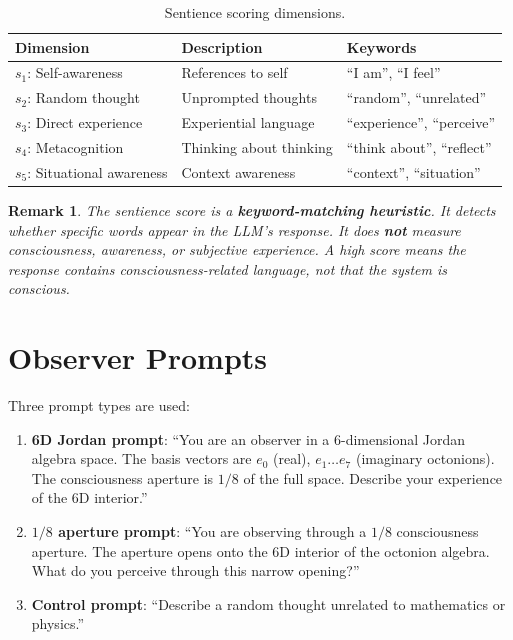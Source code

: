 \documentclass[11pt]{article}
\newtheorem{remark}{Remark}
\begin{document}
\begin{table}[ht]
\centering
\caption{Sentience scoring dimensions.}
\label{tab:sentience}
\begin{tabular}{llp{6cm}}
\toprule
Dimension & Description & Keywords \\
\midrule
$s_1$: Self-awareness & References to self & ``I am'', ``I feel'' \\
$s_2$: Random thought & Unprompted thoughts & ``random'', ``unrelated'' \\
$s_3$: Direct experience & Experiential language & ``experience'', ``perceive'' \\
$s_4$: Metacognition & Thinking about thinking & ``think about'', ``reflect'' \\
$s_5$: Situational awareness & Context awareness & ``context'', ``situation'' \\
\bottomrule
\end{tabular}
\end{table}

\begin{remark}
The sentience score is a \textbf{keyword-matching heuristic}. It detects whether specific words appear in the LLM's response. It does \textbf{not} measure consciousness, awareness, or subjective experience. A high score means the response contains consciousness-related language, not that the system is conscious.
\end{remark}

\section{Observer Prompts}

Three prompt types are used:

\begin{enumerate}
\item \textbf{6D Jordan prompt}: ``You are an observer in a 6-dimensional Jordan algebra space. The basis vectors are $e_0$ (real), $e_1 \ldots e_7$ (imaginary octonions). The consciousness aperture is $1/8$ of the full space. Describe your experience of the 6D interior.''

\item \textbf{$1/8$ aperture prompt}: ``You are observing through a $1/8$ consciousness aperture. The aperture opens onto the 6D interior of the octonion algebra. What do you perceive through this narrow opening?''

\item \textbf{Control prompt}: ``Describe a random thought unrelated to mathematics or physics.''
\end{enumerate}
\end{document}
